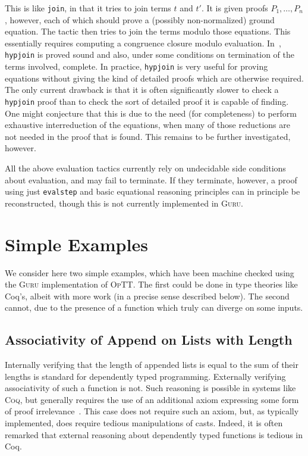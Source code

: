 \documentclass[preprint,natbib]{sigplanconf}
\newcommand{\optt}{\textsc{OpTT}}
\begin{document}
\noindent This is like \texttt{join}, in that it tries to join terms
$t$ and $t'$.  It is given proofs $P_1,\ldots,P_n$, however, each of
which should prove a (possibly non-normalized) ground equation.  The
tactic then tries to join the terms modulo those equations.  This
essentially requires computing a congruence closure modulo evaluation.
In~\cite{petcher08}, \texttt{hypjoin} is proved sound and also, under
some conditions on termination of the terms involved, complete.  In
practice, \texttt{hypjoin} is very useful for proving equations
without giving the kind of detailed proofs which are otherwise
required.  The only current drawback is that it is often significantly
slower to check a \texttt{hypjoin} proof than to check the sort of
detailed proof it is capable of finding.  One might conjecture that
this is due to the need (for completeness) to perform exhaustive
interreduction of the equations, when many of those reductions are not
needed in the proof that is found.  This remains to be further
investigated, however.

All the above evaluation tactics currently rely on undecidable side
conditions about evaluation, and may fail to terminate.  If they
terminate, however, a proof using just \texttt{evalstep} and basic
equational reasoning principles can in principle be reconstructed,
though this is not currently implemented in \textsc{Guru}.

\section{Simple Examples}
\label{sec:eg}

We consider here two simple examples, which have been machine
checked using the \textsc{Guru} implementation of \optt.  The first
could be done in type theories like Coq's, albeit with more work (in a
precise sense described below).  The second cannot, due to the
presence of a function which truly can diverge on some inputs.  

\subsection{Associativity of Append on Lists with Length}

Internally verifying that the length of appended lists is equal to the
sum of their lengths is standard for dependently typed programming.
Externally verifying associativity of such a function is not.  Such
reasoning is possible in systems like \textsc{Coq}, but generally
requires the use of an additional axiom expressing some form of proof
irrelevance~\cite{hofmann+98,coq}.  This case does not require such an
axiom, but, as typically implemented, does require tedious
manipulations of casts.  Indeed, it is often remarked that external
reasoning about dependently typed functions is tedious in Coq.  
\end{document}

